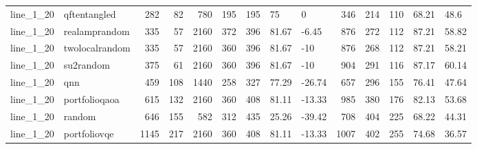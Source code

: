 \begin{longtable}{llrrrrlllrrlll}
line\_1\_20 & qftentangled & 282 & 82 & 780 & 195 & 195 & 75 & 0 & 346 & 214 & 110 & 68.21 & 48.6 \\
line\_1\_20 & realamprandom & 335 & 57 & 2160 & 372 & 396 & 81.67 & -6.45 & 876 & 272 & 112 & 87.21 & 58.82 \\
line\_1\_20 & twolocalrandom & 335 & 57 & 2160 & 360 & 396 & 81.67 & -10 & 876 & 268 & 112 & 87.21 & 58.21 \\
line\_1\_20 & su2random & 375 & 61 & 2160 & 360 & 396 & 81.67 & -10 & 904 & 291 & 116 & 87.17 & 60.14 \\
line\_1\_20 & qnn & 459 & 108 & 1440 & 258 & 327 & 77.29 & -26.74 & 657 & 296 & 155 & 76.41 & 47.64 \\
line\_1\_20 & portfolioqaoa & 615 & 132 & 2160 & 360 & 408 & 81.11 & -13.33 & 985 & 380 & 176 & 82.13 & 53.68 \\
line\_1\_20 & random & 646 & 155 & 582 & 312 & 435 & 25.26 & -39.42 & 708 & 404 & 225 & 68.22 & 44.31 \\
line\_1\_20 & portfoliovqe & 1145 & 217 & 2160 & 360 & 408 & 81.11 & -13.33 & 1007 & 402 & 255 & 74.68 & 36.57 \\
\end{longtable}
